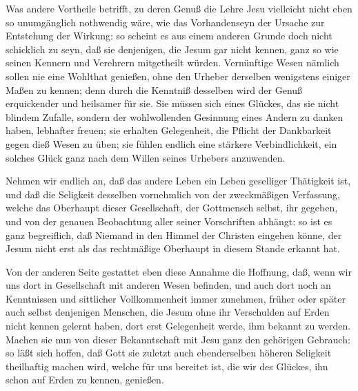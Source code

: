 \begin{aufza}
\begin{aufzc}
\item Was andere Vortheile betrifft, zu deren Genuß die Lehre Jesu vielleicht nicht eben so unumgänglich nothwendig wäre, wie das Vorhandenseyn der Ursache zur Entstehung der Wirkung: so scheint es aus einem anderen Grunde doch nicht schicklich zu seyn, daß sie denjenigen, die Jesum gar nicht kennen, ganz so wie seinen Kennern und Verehrern mitgetheilt würden. Vernünftige Wesen nämlich sollen nie eine Wohlthat genießen, ohne den Urheber derselben wenigstens einiger Maßen zu kennen; denn durch die Kenntniß desselben wird der Genuß erquickender und heilsamer für sie. Sie müssen sich eines Glückes, das sie nicht blindem Zufalle, sondern der wohlwollenden Gesinnung eines Andern zu danken haben, lebhafter freuen; sie erhalten Gelegenheit, die Pflicht der Dankbarkeit gegen dieß Wesen zu üben; sie fühlen endlich eine stärkere Verbindlichkeit, ein solches Glück ganz nach dem Willen seines Urhebers anzuwenden.~
\item Nehmen wir endlich an, daß das andere Leben ein Leben geselliger Thätigkeit ist, und daß die Seligkeit desselben vornehmlich von der zweckmäßigen Verfassung, welche das Oberhaupt dieser Gesellschaft, der Gottmensch selbst, ihr gegeben, und von der genauen Beobachtung aller seiner Vorschriften abhängt: so ist es ganz begreiflich, daß Niemand in den Himmel der Christen eingehen könne, der Jesum nicht erst als das rechtmäßige Oberhaupt in diesem Stande erkannt hat.
\begin{RWanm} 
Von der anderen Seite gestattet eben diese Annahme die Hoffnung, daß, wenn wir uns dort in Gesellschaft mit anderen Wesen befinden, und auch dort noch an Kenntnissen und sittlicher Vollkommenheit immer zunehmen, früher oder später auch selbst denjenigen Menschen, die Jesum ohne ihr Verschulden auf Erden nicht kennen gelernt haben, dort erst Gelegenheit werde, ihm bekannt zu werden. Machen sie nun von dieser Bekanntschaft mit Jesu ganz den gehörigen Gebrauch: so läßt sich hoffen, daß Gott sie zuletzt auch ebenderselben höheren Seligkeit theilhaftig machen wird, welche für uns bereitet ist, die wir des Glückes, ihn schon auf Erden zu kennen, genießen.
\end{RWanm}
\end{aufzc}
\end{aufza}

